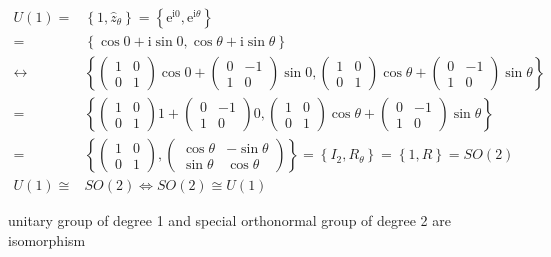 \documentclass[
]{book}
\theoremstyle{definition}
\theoremstyle{definition}
\theoremstyle{definition}
\theoremstyle{definition}
\theoremstyle{remark}
\begin{document}
\[
\begin{aligned}
U\left(1\right)= & \left\{ 1,\hat{z}_{{\scriptscriptstyle \theta}}\right\} =\left\{ \mathrm{e}^{\mathrm{i}0},\mathrm{e}^{\mathrm{i}\theta}\right\} \\
= & \left\{ \cos0+\mathrm{i}\sin0,\cos\theta+\mathrm{i}\sin\theta\right\} \\
\leftrightarrow & \left\{ \begin{pmatrix}1 & 0\\
0 & 1
\end{pmatrix}\cos0+\begin{pmatrix}0 & -1\\
1 & 0
\end{pmatrix}\sin0,\begin{pmatrix}1 & 0\\
0 & 1
\end{pmatrix}\cos\theta+\begin{pmatrix}0 & -1\\
1 & 0
\end{pmatrix}\sin\theta\right\} \\
= & \left\{ \begin{pmatrix}1 & 0\\
0 & 1
\end{pmatrix}1+\begin{pmatrix}0 & -1\\
1 & 0
\end{pmatrix}0,\begin{pmatrix}1 & 0\\
0 & 1
\end{pmatrix}\cos\theta+\begin{pmatrix}0 & -1\\
1 & 0
\end{pmatrix}\sin\theta\right\} \\
= & \left\{ \begin{pmatrix}1 & 0\\
0 & 1
\end{pmatrix},\begin{pmatrix}\cos\theta & -\sin\theta\\
\sin\theta & \cos\theta
\end{pmatrix}\right\} =\left\{ I_{{\scriptscriptstyle 2}},R_{{\scriptscriptstyle \theta}}\right\} =\left\{ 1,R\right\} =SO\left(2\right)\\
U\left(1\right)\cong & SO\left(2\right)\Leftrightarrow SO\left(2\right)\cong U\left(1\right)
\end{aligned}
\]

unitary group of degree 1 and special orthonormal group of degree 2 are isomorphism
\end{document}

